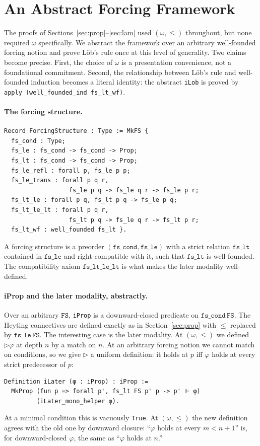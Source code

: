 \section{An Abstract Forcing Framework}
\label{sec:abstract}

The proofs of Sections~\ref{sec:prop}--\ref{sec:lam} used
$(\omega, \le)$ throughout, but none required $\omega$ specifically.
We abstract the framework over an arbitrary well-founded forcing
notion and prove Löb's rule once at this level of generality.  Two
claims become precise.  First, the choice of $\omega$ is a
presentation convenience, not a foundational commitment.  Second, the
relationship between Löb's rule and well-founded induction becomes a
literal identity: the abstract \texttt{iLob} is proved by
\texttt{apply (well\_founded\_ind fs\_lt\_wf)}.

\paragraph{The forcing structure.}
\begin{lstlisting}
Record ForcingStructure : Type := MkFS {
  fs_cond : Type;
  fs_le : fs_cond -> fs_cond -> Prop;
  fs_lt : fs_cond -> fs_cond -> Prop;
  fs_le_refl : forall p, fs_le p p;
  fs_le_trans : forall p q r,
                  fs_le p q -> fs_le q r -> fs_le p r;
  fs_lt_le : forall p q, fs_lt p q -> fs_le p q;
  fs_lt_le_lt : forall p q r,
                  fs_lt p q -> fs_le q r -> fs_lt p r;
  fs_lt_wf : well_founded fs_lt }.
\end{lstlisting}
\noindent
A forcing structure is a preorder
$(\mathtt{fs\_cond}, \mathtt{fs\_le})$ with a strict relation
$\mathtt{fs\_lt}$ contained in $\mathtt{fs\_le}$ and right-compatible
with it, such that $\mathtt{fs\_lt}$ is well-founded.  The
compatibility axiom $\mathtt{fs\_lt\_le\_lt}$ is what makes the later
modality well-defined.

\paragraph{iProp and the later modality, abstractly.}
Over an arbitrary $\mathtt{FS}$, \texttt{iProp} is a downward-closed
predicate on $\mathtt{fs\_cond}\, \mathtt{FS}$. The Heyting
connectives are defined exactly as in Section~\ref{sec:prop} with
$\le$ replaced by $\mathtt{fs\_le}\, \mathtt{FS}$.  The interesting
case is the later modality.  At $(\omega, \le)$ we defined
$\triangleright \varphi$ at depth $n$ by a match on $n$.  At an
arbitrary forcing notion we cannot match on conditions, so we give
$\triangleright$ a uniform definition: it holds at $p$ iff $\varphi$
holds at every strict predecessor of $p$:
\begin{lstlisting}
Definition iLater (φ : iProp) : iProp :=
  MkProp (fun p => forall p', fs_lt FS p' p -> p' ⊩ φ)
         (iLater_mono_helper φ).
\end{lstlisting}
\noindent
At a minimal condition this is vacuously \texttt{True}.  At
$(\omega, \le)$ the new definition agrees with the old one by
downward closure: ``$\varphi$ holds at every $m < n+1$'' is, for
downward-closed $\varphi$, the same as ``$\varphi$ holds at $n$.''

